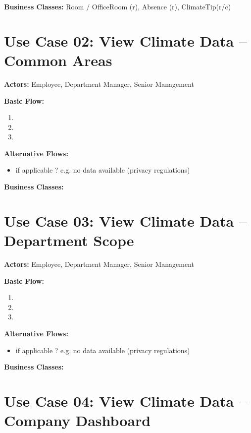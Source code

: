 \documentclass{article}
\begin{document}
\textbf{Business Classes:} Room / OfficeRoom (r), Absence (r), ClimateTip(r/c)
\vspace{1em}

\section*{Use Case 02: View Climate Data -- Common Areas}

\textbf{Actors:} Employee, Department Manager, Senior Management 

\textbf{Basic Flow:}
\begin{enumerate}
    \item
    \item
    \item 
\end{enumerate}

\textbf{Alternative Flows:}
\begin{itemize}
    \item if applicable ? e.g. no data available (privacy regulations)
\end{itemize}

\textbf{Business Classes:}
\vspace{1em}

\section*{Use Case 03: View Climate Data -- Department Scope}

\textbf{Actors:} Employee, Department Manager, Senior Management 

\textbf{Basic Flow:}
\begin{enumerate}
    \item
    \item
    \item 
\end{enumerate}

\textbf{Alternative Flows:}
\begin{itemize}
    \item if applicable ? e.g. no data available (privacy regulations)
\end{itemize}

\textbf{Business Classes:}
\vspace{1em}


\section*{Use Case 04: View Climate Data -- Company Dashboard}
\end{document}
